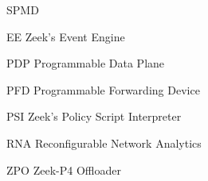 
\begin{listofabbrv}{SPMD}
    \item[EE]  Zeek's Event Engine
    \item[PDP] Programmable Data Plane
    \item[PFD] Programmable Forwarding Device
    \item[PSI] Zeek's Policy Script Interpreter
    \item[RNA] Reconfigurable Network Analytics
    \item[ZPO] Zeek-P4 Offloader
\end{listofabbrv}
